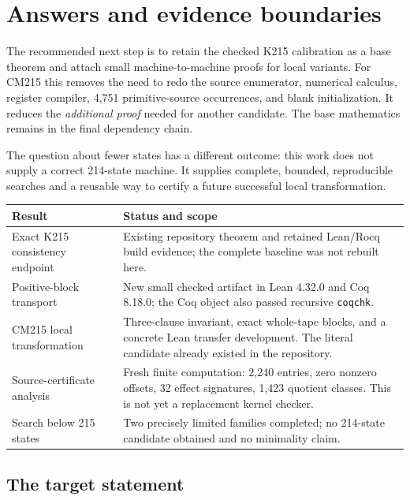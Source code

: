 \documentclass[11pt,letterpaper]{article}
\theoremstyle{definition}
\begin{document}
\tableofcontents
\newpage

\section{Answers and evidence boundaries}

The recommended next step is to retain the checked K215 calibration as a
base theorem and attach small machine-to-machine proofs for local variants.
For CM215 this removes the need to redo the source enumerator, numerical
calculus, register compiler, 4,751 primitive-source occurrences, and blank
initialization. It reduces the \emph{additional proof} needed for another
candidate. The base mathematics remains in the final dependency chain.

The question about fewer states has a different outcome: this work does
not supply a correct 214-state machine. It supplies complete, bounded,
reproducible searches and a reusable way to certify a future successful
local transformation.

\begin{center}
\begin{tabularx}{\textwidth}{@{}p{}X@{}}
\toprule
Result & Status and scope\\
\midrule
Exact K215 consistency endpoint & Existing repository theorem and retained
Lean/Rocq build evidence; the complete baseline was not rebuilt here.\\
Positive-block transport & New small checked artifact in Lean 4.32.0 and
Coq 8.18.0; the Coq object also passed recursive \texttt{coqchk}.\\
CM215 local transformation & Three-clause invariant, exact whole-tape
blocks, and a concrete Lean transfer development. The literal candidate
already existed in the repository.\\
Source-certificate analysis & Fresh finite computation: 2,240 entries,
zero nonzero offsets, 32 effect signatures, 1,423 quotient classes.
This is not yet a replacement kernel checker.\\
Search below 215 states & Two precisely limited families completed;
no 214-state candidate obtained and no minimality claim.\\
\bottomrule
\end{tabularx}
\end{center}

\subsection{The target statement}
\end{document}

